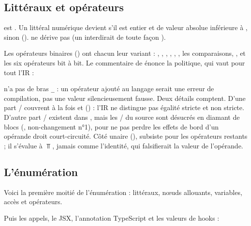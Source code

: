 \subsection{Littéraux et opérateurs}


 est . Un littéral numérique devient  s'il est entier et de valeur absolue inférieure à ,  sinon ().  ne dérive pas  (un  interdirait de toute façon ).

Les opérateurs binaires () ont chacun leur variant : , , , , , , les comparaisons, ,  et les six opérateurs bit à bit. Le commentaire de  énonce la politique, qui vaut pour tout l'IR :


 n'a pas de bras \texttt{\_} : un opérateur ajouté au langage serait une erreur de compilation, pas une valeur silencieusement fausse. Deux détails comptent. D'une part / couvrent à la fois \code{==} et \code{===} () : l'IR ne distingue pas égalité stricte et non stricte. D'autre part / existent dans , mais les \code{&&}/\code{||} du source sont désucrés en diamant de blocs (, non-changement n°1), pour ne pas perdre les effets de bord d'un opérande droit court-circuité. Côté unaire (),  subsiste pour les opérateurs restants ; il s'évalue à $\Top$, \og jamais comme l'identité, qui falsifierait la valeur de l'opérande\fg{}.

\subsection{L'énumération }

Voici la première moitié de l'énumération : littéraux, nœuds allouants, variables, accès et opérateurs.


Puis les appels, le JSX, l'annotation TypeScript et les valeurs de hooks :

